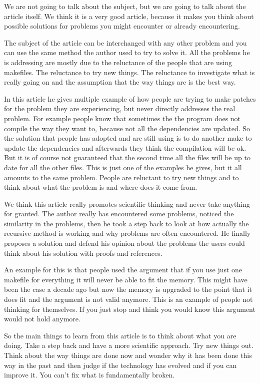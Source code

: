 

We are not going to talk about the subject, but we are going to talk about the article itself. We think it is a very good article, because it makes you think about possible solutions for problems you might encounter or already encountering.

The subject of the article can be interchanged with any other problem and you can use the same method the author used to try to solve it.
All the problems he is addressing are mostly due to the reluctance of the people that are using makefiles. The reluctance to try new things. The reluctance to investigate what is really going on and the assumption that the way things are is the best way.

In this article he gives multiple example of how people are trying to make patches for the problem they are experiencing, but never directly addresses the real problem. For example people know that sometimes the the program does not compile the way they want to, because not all the dependencies are updated. So the solution that people has adopted and are still using is to do another make to update the dependencies and afterwards they think the compilation will be ok. But it is of course not guaranteed that the second time all the files will be up to date for all the other files. This is just one of the examples he gives, but it all amounts to the same problem. People are reluctant to try new things and to think about what the problem is and where does it come from.

We think this article really promotes scientific thinking and never take anything for granted. The author really has encountered some problems, noticed the similarity in the problems, then he took a step back to look at how actually the recursive method is working and why problems are often encountered. He finally proposes a solution and defend his opinion about the problems the users could think about his solution with proofs and references.

An example for this is that people used the argument that if you use just one makefile for everything it will never be able to fit the memory. This might have been the case a decade ago but now the memory is upgraded to the point that it does fit and the argument is not valid anymore. This is an example of people not thinking for themselves. If you just stop and think you would know this argument would not hold anymore.

So the main things to learn from this article is to think about what you are doing. Take a step back and have a more scientific approach. Try new things out. Think about the way things are done now and wonder why it has been done this way in the past and then judge if the technology has evolved and if you can improve it. You can't fix what is fundamentally broken.

